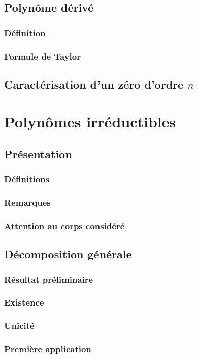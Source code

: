 \documentclass[12pt,a4paper,french]{book}
\begin{document}
		\subsection{Polynôme dérivé}
			\subsubsection{Définition}
			\subsubsection{Formule de Taylor}
		\subsection{Caractérisation d'un zéro d'ordre $n$}
	\section{Polynômes irréductibles}
		\subsection{Présentation}
			\subsubsection{Définitions}
			\subsubsection{Remarques}
			\subsubsection{Attention au corps considéré}
		\subsection{Décomposition générale}
			\subsubsection{Résultat préliminaire}
			\subsubsection{Existence}
			\subsubsection{Unicité}
			\subsubsection{Première application}
\end{document}
